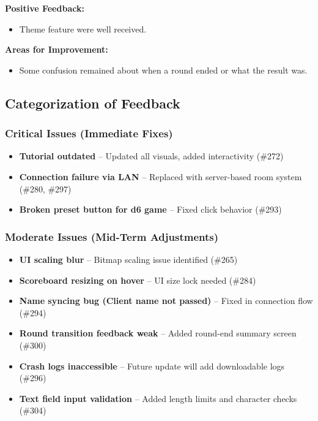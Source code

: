 \documentclass{article}
\begin{document}
\textbf{Positive Feedback:}
\begin{itemize}
    \item Theme feature were well received.
\end{itemize}

\textbf{Areas for Improvement:}
\begin{itemize}
    \item Some confusion remained about when a round ended or what the result was.
\end{itemize}


\subsection{Categorization of Feedback}

\subsubsection{Critical Issues (Immediate Fixes)}
\begin{itemize}
    \item \textbf{Tutorial outdated} – Updated all visuals, added interactivity (\#272)
    \item \textbf{Connection failure via LAN} – Replaced with server-based room system (\#280, \#297)
    \item \textbf{Broken preset button for d6 game} – Fixed click behavior (\#293)
\end{itemize}

\subsubsection{Moderate Issues (Mid-Term Adjustments)}
\begin{itemize}
    \item \textbf{UI scaling blur} – Bitmap scaling issue identified (\#265)
    \item \textbf{Scoreboard resizing on hover} – UI size lock needed (\#284)
    \item \textbf{Name syncing bug (Client name not passed)} – Fixed in connection flow (\#294)
    \item \textbf{Round transition feedback weak} – Added round-end summary screen (\#300)
    \item \textbf{Crash logs inaccessible} – Future update will add downloadable logs (\#296)
    \item \textbf{Text field input validation} – Added length limits and character checks (\#304)
\end{itemize}
\end{document}
